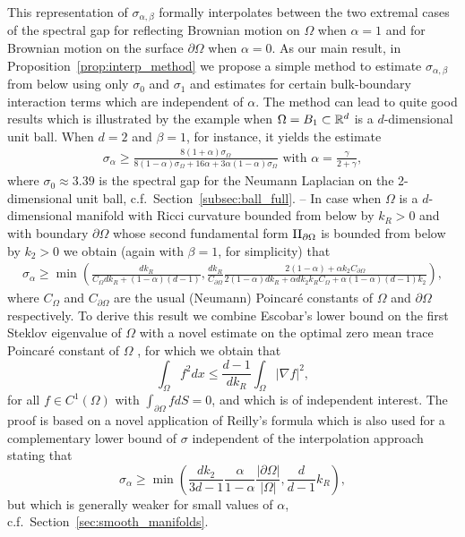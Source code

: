 \documentclass[a4paper]{article}
\theoremstyle{definition}
\numberwithin{equation}{section}
\begin{document}
This representation of $\sigma_{\alpha,\beta}$  formally interpolates between the two extremal cases of the spectral gap for reflecting Brownian motion on $\Omega$ when $\alpha=1$ and for  Brownian motion on the surface $\partial \Omega$ when $\alpha=0$. As our main result,  in  Proposition~\ref{prop:interp_method} we propose a simple method to estimate $\sigma_{\alpha,\beta}$ from below using only $\sigma_0$ and $\sigma_1$  and estimates for certain bulk-boundary interaction terms  which are independent of $\alpha$. The method can lead to quite good results which is  illustrated by the example when $\Omega=B_1 \subset \mathbb{R}^d$ is a $d$-dimensional unit ball. When $d=2$ and $\beta =1$, for instance, it yields the estimate  
\begin{align*}
\sigma_\alpha \geq
\frac{8(1+\alpha)\sigma_{\Omega} }{8 (1-\alpha)\sigma_{\Omega}+16\alpha+3\alpha(1-\alpha)\sigma_{\Omega}}
 \mbox{ with }  \alpha = \frac \gamma {2+\gamma},
\end{align*}
where $\sigma_0\approx 3.39$ is the spectral gap for the Neumann Laplacian on the 2-dimensional unit ball, c.f.\  Section~\ref{subsec:ball_full}. --
In case when $\Omega$ is a $d$-dimensional manifold with Ricci curvature bounded from below by $k_R>0$ and with boundary $\partial \Omega $ whose second fundamental  form $\mathop{\rm II}_{\partial \Omega}$ is bounded from below by $k_2>0$ we obtain  (again with  $\beta =1$, for simplicity) that 
\begin{align*}
    \sigma_\alpha \geq 
\min \left( \frac{d k_R}{
C_\Omega d k_R + (1-\alpha)(d-1) },\frac{d k_R}{C_{\partial\Omega}}
\frac{2(1-\alpha)+\alpha  k_2 C_{\partial\Omega}}{2(1-\alpha) dk_R +\alpha d k_2 k_R C_\Omega +\alpha(1-\alpha)(d-1)k_2 } \right),
\end{align*}
where $C_\Omega$ and $C_{\partial \Omega} $ are the usual (Neumann) Poincaré constants of $\Omega$ and $\partial \Omega$ respectively. To derive this result we combine Escobar's lower bound \cite{escobar} on the first Steklov eigenvalue \cite{MR3662010,Nazarov} of $\Omega$ with a novel estimate on the optimal zero mean trace Poincaré constant  of $\Omega$  \cite{Matculevich_Repin,Nazarov_Repin}, for which we obtain that
\[
\int_\Omega f^ 2  dx \leq \frac {d-1}{d  k_R} \int_\Omega  |\nabla f|^2 , \]
for all  $f\in C^1(\Omega)$ with  $\int_{\partial \Omega} f dS =0$, and which is of independent interest. The proof is based on a novel application of Reilly's formula \cite{reilly} which is also used  for a  complementary lower bound of $\sigma$ independent of the interpolation approach stating that 
\[ \sigma_{\alpha} \geq \min\left(\frac {d k_2 }{3 d -1 }\frac \alpha {1-\alpha} \frac{|\partial \Omega|}{|\Omega|},\frac {d}{d-1}k_R\right),  \]
but which is generally weaker for small values of $\alpha$, c.f.\ Section~\ref{sec:smooth_manifolds}.
\end{document}
